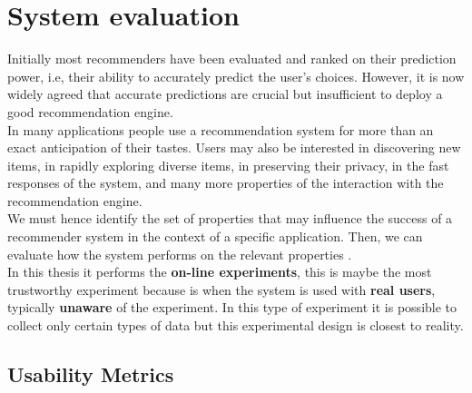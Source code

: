 \chapter{System evaluation}\label{systemevaluation}

Initially most recommenders have been evaluated and ranked on their
prediction power, i.e, their ability to accurately predict the user's
choices. However, it is now widely agreed that accurate predictions
are crucial but insufficient to deploy a good recommendation engine.
\\ In many applications people use a recommendation system for more than
an exact anticipation of their tastes. Users may also be interested
in discovering new items, in rapidly exploring diverse items, in
preserving their privacy, in the fast responses of the system, and
many more properties of the interaction with the recommendation
engine. \\ We must hence identify the set of properties that may
influence the success of a recommender system in the context of a
specific application. Then, we can evaluate how the system performs on
the relevant properties  \cite{adomavicius2011context}.
\\ In this thesis it performs the \textbf{on-line experiments}, 
this is maybe the most trustworthy experiment because is when 
the system is  used with \textbf{real users}, typically 
\textbf{unaware} of the experiment. In this type of experiment 
it is possible to collect only certain types
of data but this experimental design is closest to reality.

\section{Usability Metrics}

